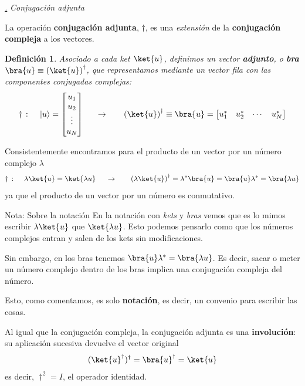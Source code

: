 \documentclass[a4paper,11pt]{book} %
\newtheorem{definicion_contador}{Definición}
\newcommand{\Definicion}[1]{
		\begin{mybox_gray2}{}
			\begin{definicion_contador}
				 #1 
			\end{definicion_contador} 
		\end{mybox_gray2}
	}
\numberwithin{equation}{chapter}
\def\subsubiContadorIt{\par\addtocounter{subsubsection}{1}\underline{\it\thesubsubsection.}\hskip0.5cm \setcounter{subsubsubsectionIt}{0}}
\newcommand{\SubsubiIt}[1]{
		\subsubiContadorIt \textit{#1}
	}
\newcounter{subsubsubsectionIt}[subsubsection]
\begin{document}
		\SubsubiIt{Conjugación adjunta}
		
La operación \textbf{conjugación adjunta},  $\dagger$, es una \textit{extensión} de la \textbf{conjugación compleja}  a los vectores.

	\Definicion{
	Asociado a cada \textit{ket }$\ket{u}$, definimos un vector \textbf{adjunto}, o \textbf{bra} $\bra{u}\equiv\left(\ket{u}\right)^\dagger$,  que representamos mediante un vector fila con las componentes conjugadas complejas:  
		\begin{equation}
\dagger \,: \quad\,|u\rangle = \begin{bmatrix} {u_1}\\ {u_2}\\ \vdots \\ {u_N} \end{bmatrix} 
~~~~~{\rightarrow}~~~~~~ \left(\ket{u}\right)^\dagger \equiv \bra{u} =\begin{bmatrix} {u_1^*} & {u_2^*} & \cdots & {u_N^*}
\end{bmatrix}
		\end{equation}
	}

Consistentemente encontramos para el producto de un vector por un número complejo $\lambda$
	\begin{equation}
	\dagger \,:\quad\,  \lambda\ket{u}=\ket{\lambda u} ~~~~~{\rightarrow}~~~~~~ \left(\lambda\ket{u}\right)^\dagger=\lambda^*\bra{u} = \bra{u}\lambda^* = \bra{\lambda u}
	\end{equation}
ya que el producto de un vector por un número es conmutativo.		
		
	\begin{mybox_blue}{Nota: Sobre la notación}
	En la notación con \textit{kets} y \textit{bras} vemos que es lo mimos escribir $\lambda\ket{u}$ que $\ket{\lambda u}$. Esto podemos pensarlo como que los números complejos entran y salen de los kets sin modificaciones. 
	\vspace{0.3cm}
	
	Sin embargo, en los bras tenemos $\bra{u}\lambda^* = \bra{\lambda u}$. Es decir, sacar o meter un número complejo dentro de los bras implica una conjugación compleja del número. 
	\vspace{0.3cm}
	
	Esto, como comentamos, es solo \textbf{notación}, es decir, un convenio para escribir las cosas.
	\end{mybox_blue}
		
Al igual que la conjugación compleja, la conjugación adjunta es una \textbf{involución}: su aplicación sucesiva devuelve el vector original
\begin{equation}
(\ket{u}^\dagger)^\dagger =\bra{u}^\dagger =  \ket{u}
\end{equation}
es decir, $\dagger^2 = I$, el operador identidad.		
		
\end{document}
